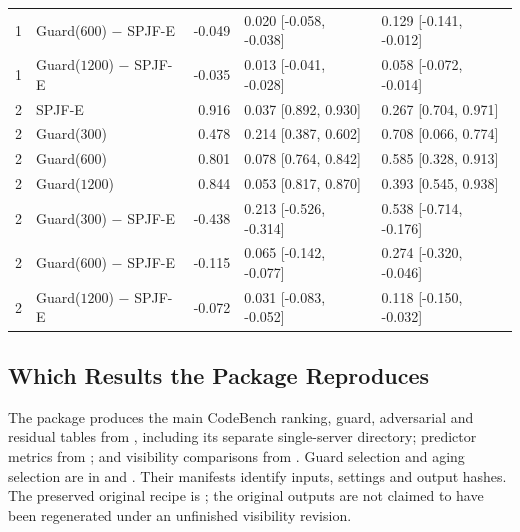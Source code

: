 \documentclass[mathematics,supfile,submit,moreauthors]{Definitions/mdpi}
\newcommand{\devnum}[1]{#1}
\begin{document}
\begin{table}[htbp]
\begin{tabular}{llrll}
\devnum{1} & Guard($\devnum{600}$) $-$ SPJF-E & \devnum{-0.049} & \devnum{0.020 [-0.058, -0.038]} & \devnum{0.129 [-0.141, -0.012]} \\
\devnum{1} & Guard($\devnum{1200}$) $-$ SPJF-E & \devnum{-0.035} & \devnum{0.013 [-0.041, -0.028]} & \devnum{0.058 [-0.072, -0.014]} \\
\midrule
\devnum{2} & SPJF-E                         & \devnum{0.916} & \devnum{0.037 [0.892, 0.930]} & \devnum{0.267 [0.704, 0.971]} \\
\devnum{2} & Guard($\devnum{300}$)          & \devnum{0.478} & \devnum{0.214 [0.387, 0.602]} & \devnum{0.708 [0.066, 0.774]} \\
\devnum{2} & Guard($\devnum{600}$)          & \devnum{0.801} & \devnum{0.078 [0.764, 0.842]} & \devnum{0.585 [0.328, 0.913]} \\
\devnum{2} & Guard($\devnum{1200}$)         & \devnum{0.844} & \devnum{0.053 [0.817, 0.870]} & \devnum{0.393 [0.545, 0.938]} \\
\devnum{2} & Guard($\devnum{300}$) $-$ SPJF-E & \devnum{-0.438} & \devnum{0.213 [-0.526, -0.314]} & \devnum{0.538 [-0.714, -0.176]} \\
\devnum{2} & Guard($\devnum{600}$) $-$ SPJF-E & \devnum{-0.115} & \devnum{0.065 [-0.142, -0.077]} & \devnum{0.274 [-0.320, -0.046]} \\
\devnum{2} & Guard($\devnum{1200}$) $-$ SPJF-E & \devnum{-0.072} & \devnum{0.031 [-0.083, -0.052]} & \devnum{0.118 [-0.150, -0.032]} \\
\bottomrule
\end{tabular}
\end{table}


\subsection{Which Results the Package Reproduces}

The package produces the main CodeBench ranking, guard, adversarial and residual
tables from , including its separate single-server
directory; predictor metrics from ; and visibility
comparisons from . Guard selection and aging selection
are in  and . Their
manifests identify inputs, settings and output hashes. The preserved original
recipe is ; the original outputs are not
claimed to have been regenerated under an unfinished visibility revision.
\end{document}
